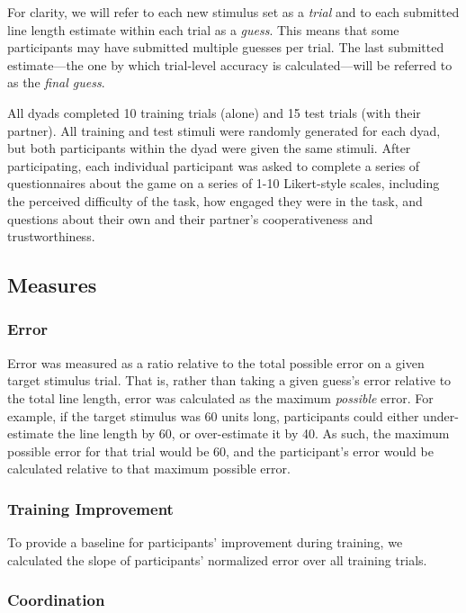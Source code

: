 \documentclass[10pt, letterpaper]{article}
\begin{document}
For clarity, we will refer to each new stimulus set as a \emph{trial}
and to each submitted line length estimate within each trial as a
\emph{guess}. This means that some participants may have submitted
multiple guesses per trial. The last submitted estimate---the one by
which trial-level accuracy is calculated---will be referred to as the
\emph{final guess}.

All dyads completed 10 training trials (alone) and 15 test trials (with
their partner). All training and test stimuli were randomly generated
for each dyad, but both participants within the dyad were given the same
stimuli. After participating, each individual participant was asked to
complete a series of questionnaires about the game on a series of 1-10
Likert-style scales, including the perceived difficulty of the task, how
engaged they were in the task, and questions about their own and their
partner's cooperativeness and trustworthiness.

\subsection{Measures}\label{measures}

\subsubsection{Error}\label{error}

Error was measured as a ratio relative to the total possible error on a
given target stimulus trial. That is, rather than taking a given guess's
error relative to the total line length, error was calculated as the
maximum \emph{possible} error. For example, if the target stimulus was
60 units long, participants could either under-estimate the line length
by 60, or over-estimate it by 40. As such, the maximum possible error
for that trial would be 60, and the participant's error would be
calculated relative to that maximum possible error.

\subsubsection{Training Improvement}\label{training-improvement}

To provide a baseline for participants' improvement during training, we
calculated the slope of participants' normalized error over all training
trials.

\subsubsection{Coordination}\label{coordination}
\end{document}

